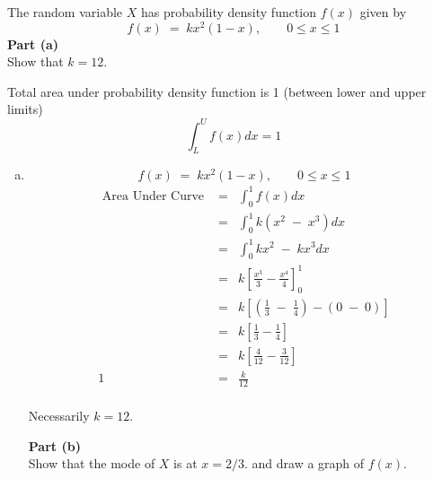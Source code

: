 \documentclass[a4paper,12pt]{article}
\begin{document}
\large
\begin{framed}
\noindent The random variable $X$ has probability density function $f(x)$ given by
\[f(x) \;=\; kx^2 (1- x) , \qquad 0 \leq x \leq 1 \]
\medskip
\noindent \textbf{Part (a)}\\
Show that $k = 12$.

\end{framed}

\large

\begin{framed}
\noindent Total area under probability density function is 1 (between lower and upper limits)
{
\Large
\[\int^{U}_{L} f(x) dx = 1\]
}
\end{framed}
\newpage

\begin{enumerate}[(a)]
\item 
\[f(x) \;=\; kx^2 (1- x) , \qquad 0 \leq x \leq 1 \]
\begin{eqnarray*}
\mbox{ Area Under Curve } &=& \int^{1}_{0} f(x) dx \\
&=& \int^{1}_{0} k(x^2\;-\;x^3) dx \\
&=& \int^{1}_{0} kx^2\;-\;kx^3 dx \\
&=& k \left[ \frac{x^3}{3} - \frac{x^4}{4}\right]^1_0\\
&=& k \left[ \left( \frac{1}{3} \;-\; \frac{1}{4} \right) - \left( 0 \;-\; 0 \right)  \right]\\
&=& k \left[  \frac{1}{3} - \frac{1}{4} \right]\\
&=& k \left[  \frac{4}{12} - \frac{3}{12} \right]\\
1 &=&  \frac{k}{12} \\
\end{eqnarray*}

Necessarily $k = 12$.
\newpage
\large
\begin{framed}
\noindent \textbf{Part (b)}\\
Show that the mode of $X$ is at $x = 2/3$.
and draw a graph of $f(x)$.
\end{framed}


\end{enumerate}
\end{document}
